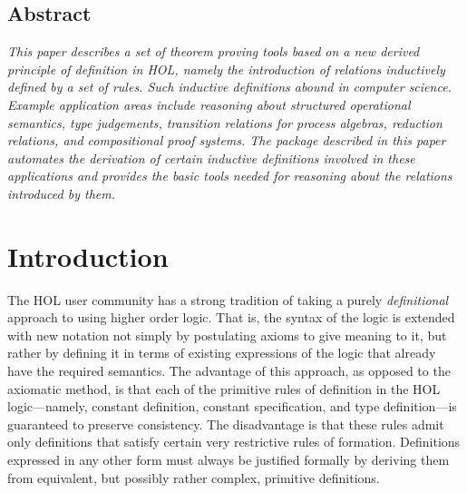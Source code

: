 \documentclass[twocolumn,fleqn,layout]{article}
\begin{document}

\sloppy




\subsection*{\centering Abstract}

{\it\sloppy This paper describes a set of theorem proving tools based on a new
derived principle of definition in HOL, namely the introduction of relations
inductively defined by a set of rules.  Such inductive definitions abound in
computer science. Example application areas \mbox{include} reasoning about
structured operational semantics, type judgements, transition relations for
process algebras, \mbox{reduction} relations, and compositional proof systems.
The package described in this paper automates the derivation of certain
inductive definitions involved in these applications and provides the basic
tools needed for reasoning about the relations introduced by them.}

\vskip12pt
\section{Introduction}

The HOL user community has a strong tradition of taking a purely {\it
definitional\/} approach to using higher order logic. That is, the syntax of
the logic is extended with new notation not simply by postulating axioms to
give meaning to it, but rather by defining it in terms of existing expressions
of the logic that already have the required semantics.  The advantage of this
approach, as opposed to the axiomatic method, is that each of the primitive
rules of definition in the {\small HOL} logic---namely, constant definition,
constant specification, and type definition---is guaranteed to preserve
consistency.  The disadvantage is that these rules admit only
\mbox{definitions} that satisfy certain very restrictive rules of formation.
Definitions expressed in any other form must always be justified formally by
deriving them from equivalent, but possibly rather complex, primitive
definitions.
\end{document}
